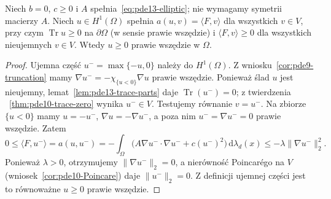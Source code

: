 \begin{twierdzenie}
\label{thm:pde13-positivity}
Niech $b=0$, $c\geq0$ i $A$ spełnia~\eqref{eq:pde13-elliptic};
nie wymagamy symetrii macierzy $A$. Niech $u\in H^1(\Omega)$
spełnia $a(u,v)=\langle F,v\rangle$ dla wszystkich $v\in V$,
przy czym $\operatorname{Tr}u\geq0$ na $\partial\Omega$
(w sensie prawie wszędzie) i
$\langle F,v\rangle\geq0$ dla wszystkich nieujemnych $v\in V$.
Wtedy $u\geq0$ prawie wszędzie w $\Omega$.
\end{twierdzenie}
\begin{proof}
Ujemna część $u^-=\max\{-u,0\}$ należy do $H^1(\Omega)$.
Z wniosku~\ref{cor:pde9-truncation} mamy
$\nabla u^-=-\chi_{\{u<0\}}\nabla u$ prawie wszędzie.
Ponieważ ślad $u$ jest nieujemny, lemat~\ref{lem:pde13-trace-parts}
daje $\operatorname{Tr}(u^-)=0$; z twierdzenia
~\ref{thm:pde10-trace-zero} wynika $u^-\in V$.
Testujemy równanie $v=u^-$. Na zbiorze $\{u<0\}$ mamy
$u=-u^-$, $\nabla u=-\nabla u^-$, a poza nim
$u^-=\nabla u^-=0$ prawie wszędzie. Zatem
\[
 0\leq\langle F,u^-\rangle=a(u,u^-)
 =-\int_\Omega \big(A\nabla u^-\cdot\nabla u^-+c(u^-)^2\big)
 \,\mathrm d\lambda_d(x)
 \leq-\lambda\|\nabla u^-\|_2^2.
\]
Ponieważ $\lambda>0$, otrzymujemy $\|\nabla u^-\|_2=0$,
a nierówność Poincarégo na $V$ (wniosek~\ref{cor:pde10-Poincare})
daje $\|u^-\|_2=0$. Z definicji ujemnej części jest to
równoważne $u\geq0$ prawie wszędzie.
\end{proof}

